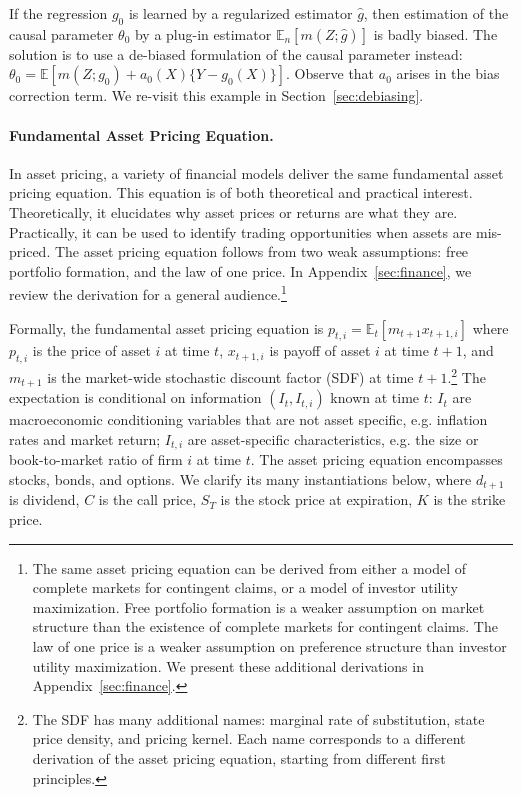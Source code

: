     If the regression $g_0$ is learned by a regularized estimator $\hat{g}$, then estimation of the causal parameter $\theta_0$  by a plug-in estimator $\mathbb{E}_n[m(Z;\hat{g})]$ is badly biased. The solution is to use a de-biased formulation of the causal parameter instead: $\theta_0=\mathbb{E}[m(Z;g_0)+a_0(X)\{Y-g_0(X)\}]$. Observe that $a_0$ arises in the bias correction term. We re-visit this example in Section~\ref{sec:debiasing}.

%

\paragraph{Fundamental Asset Pricing Equation.} In asset pricing, a variety of financial models deliver the same fundamental asset pricing equation. This equation is of both theoretical and practical interest. Theoretically, it elucidates why asset prices or returns are what they are. Practically, it can be used to identify trading opportunities when assets are mis-priced. The asset pricing equation follows from two weak assumptions: free portfolio formation, and the law of one price.  In Appendix~\ref{sec:finance}, we review the derivation for a general audience.\footnote{The same asset pricing equation can be derived from either a model of complete markets for contingent claims, or a model of investor utility maximization. Free portfolio formation is a weaker assumption on market structure than the existence of complete markets for contingent claims. The law of one price is a weaker assumption on preference structure than investor utility maximization. We present these additional derivations in Appendix~\ref{sec:finance}.}

Formally, the fundamental asset pricing equation is $p_{t,i}=\mathbb{E}_t[m_{t+1}x_{t+1,i}]$ where $p_{t,i}$ is the price of asset $i$ at time $t$, $x_{t+1,i}$ is payoff of asset $i$ at time $t+1$, and $m_{t+1}$ is the market-wide stochastic discount factor (SDF) at time $t+1$.\footnote{The SDF has many additional names: marginal rate of substitution, state price density, and pricing kernel. Each name corresponds to a different derivation of the asset pricing equation, starting from different first principles.} The expectation is conditional on information $(I_t,I_{t,i})$ known at time $t$:  $I_t$ are macroeconomic conditioning variables that are not asset specific, e.g. inflation rates and market return; $I_{t,i}$ are asset-specific characteristics, e.g. the size or book-to-market ratio of firm $i$ at time $t$. The asset pricing equation encompasses stocks, bonds, and options. We clarify its many instantiations below, where $d_{t+1}$ is dividend, $C$ is the call price, $S_T$ is the stock price at expiration, $K$ is the strike price. 

